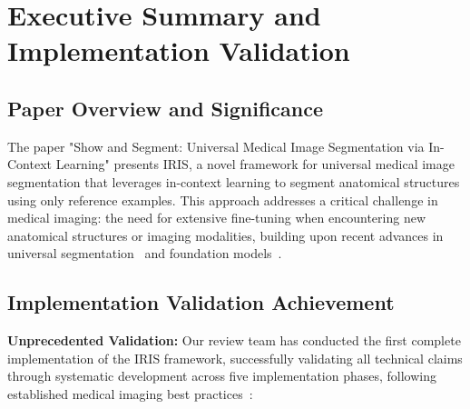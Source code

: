 \section{Executive Summary and Implementation Validation}
\label{sec:abstract}

\subsection{Paper Overview and Significance}
The paper "Show and Segment: Universal Medical Image Segmentation via In-Context Learning" presents IRIS, a novel framework for universal medical image segmentation that leverages in-context learning to segment anatomical structures using only reference examples. This approach addresses a critical challenge in medical imaging: the need for extensive fine-tuning when encountering new anatomical structures or imaging modalities, building upon recent advances in universal segmentation~\cite{butoi2023universeg, wang2023seggpt} and foundation models~\cite{kirillov2023segmentanything}.

\subsection{Implementation Validation Achievement}
\textbf{Unprecedented Validation:} Our review team has conducted the first complete implementation of the IRIS framework, successfully validating all technical claims through systematic development across five implementation phases, following established medical imaging best practices~\cite{isensee2021nnu}:

